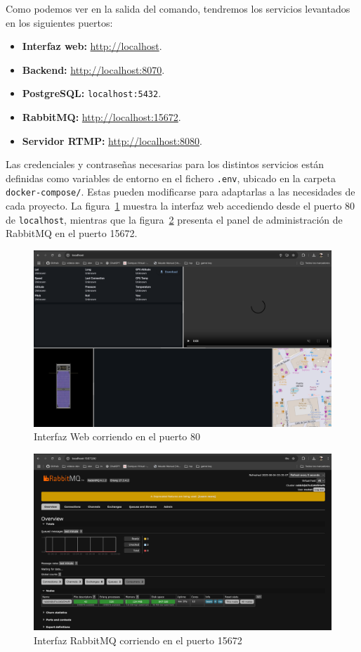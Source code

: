 Como podemos ver en la salida del comando, tendremos los servicios levantados en los siguientes puertos:
\begin{itemize}
    \item \textbf{Interfaz web:} \url{http://localhost}.
    \item \textbf{Backend:} \url{http://localhost:8070}.
    \item \textbf{PostgreSQL:} \texttt{localhost:5432}.
    \item \textbf{RabbitMQ:} \url{http://localhost:15672}.
    \item \textbf{Servidor RTMP:} \url{http://localhost:8080}.
\end{itemize}

Las credenciales y contraseñas necesarias para los distintos servicios están definidas como variables de entorno en el fichero \texttt{.env}, ubicado en la carpeta \texttt{docker-compose/}. Estas pueden modificarse para adaptarlas a las necesidades de cada proyecto.
La figura~\ref{fig:interfaz_local} muestra la interfaz web accediendo desde el puerto 80 de \texttt{localhost}, 
mientras que la figura~\ref{fig:interfaz_rabbit} presenta el panel de administración de RabbitMQ en el puerto 15672.

\begin{figure}[H]
    \centering
    \includegraphics[width=1\textwidth]{Imagenes/Bitmap/interfaz_local}
    \caption{Interfaz Web corriendo en el puerto 80}
    \label{fig:interfaz_local}
\end{figure}

\begin{figure}[H]
    \centering
    \includegraphics[width=1\textwidth]{Imagenes/Bitmap/interfaz_rabbit}
    \caption{Interfaz RabbitMQ corriendo en el puerto 15672}
    \label{fig:interfaz_rabbit}
\end{figure}
